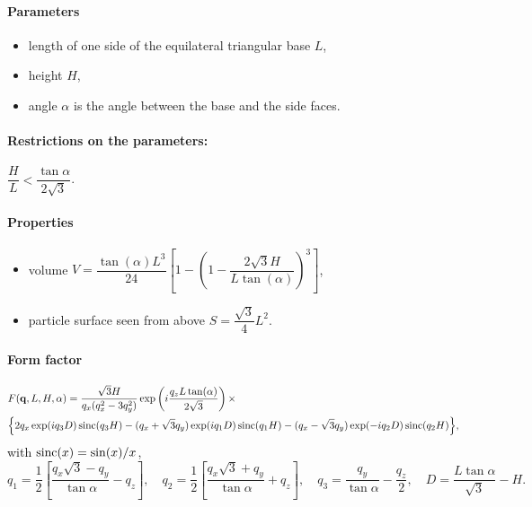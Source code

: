 \FloatBarrier

\paragraph{Parameters}
\begin{itemize}
\item length of one side of the equilateral triangular base $L$,
\item height $H$,
\item angle $\alpha$ is the angle between the base and the
  side faces.
\end{itemize}

\paragraph{Restrictions on the parameters:} 
$\dfrac{H}{L}< \dfrac{\tan{\alpha}}{2\sqrt{3}}$.

\paragraph{Properties}
\begin{itemize}
\item volume $V= \dfrac{\tan(\alpha) L^3}{24} \left[1- \left(1 -
  \dfrac{2\sqrt{3} H}{L \tan(\alpha)} \right)^3\right]$,
\item particle surface seen from above $S =\dfrac{\sqrt{3}}{4}L^2$.
\end{itemize}

\paragraph{Form factor}

\begin{align*}
&F(\mathbf{q}, L, H, \alpha)=\frac{\sqrt{3}H}{q_x (q_x^2-3q_y^2)}
\exp\left(i\frac{q_z L\tan (\alpha)}{2\sqrt{3}}\right) \times \\
&\Big\{2q_x \exp(iq_3 D)\operatorname{sinc}(q_3 H) - (q_x +\sqrt{3}q_y)
\exp(iq_1 D)\operatorname{sinc}(q_1 H) -(q_x-\sqrt{3}q_y)\exp(-iq_2
D)\operatorname{sinc}(q_2 H) \Big\}, 
\end{align*}
with $\operatorname{sinc}(x)=\sin(x)/x$,
\begin{equation*}
q_1  =\frac{1}{2}\left[\frac{q_x\sqrt{3} -q_y}{\tan \alpha}-q_z \right],
\quad q_2 = \frac{1}{2}\left[\frac{q_x\sqrt{3} +q_y}{\tan \alpha}+q_z
\right], \quad 
q_3 = \frac{q_y}{\tan \alpha} -\frac{q_z}{2}, \quad D = \frac{L \tan \alpha}{\sqrt{3}} -H.
\end{equation*}

